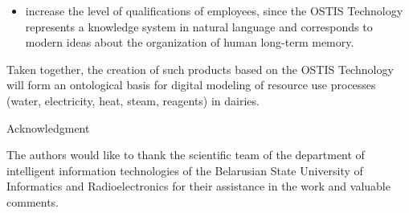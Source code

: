 \documentclass[10pt,final]{article}
\begin{document}
\begin{multicols}{2}
\begin{itemize}[leftmargin=7mm]
\item  increase the level of qualifications of employees,
since the OSTIS Technology represents a knowledge
system in natural language and corresponds to modern ideas about the organization of human long-term
memory.
\end{itemize}
\columnbreak

{Taken together, the creation of such products based
on the OSTIS Technology will form an ontological basis
for digital modeling of resource use processes (water,
electricity, heat, steam, reagents) in dairies.}
\begin{center}
    Acknowledgment
\end{center} 

The authors would like to thank the scientific team
of the department of intelligent information technologies
of the Belarusian State University of Informatics and
Radioelectronics for their assistance in the work and
valuable comments.



\end{multicols}
\end{document}
